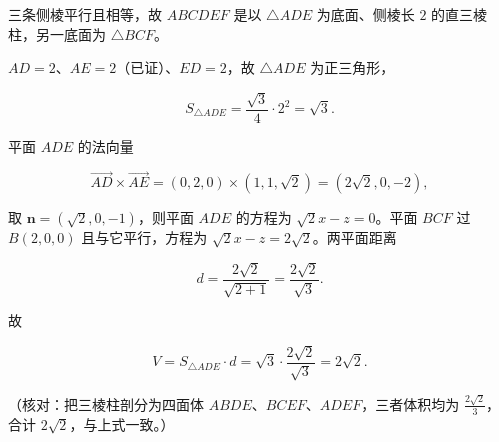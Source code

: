 \begin{answer}
三条侧棱平行且相等，故 $ABCDEF$ 是以 $\triangle ADE$ 为底面、侧棱长 $2$ 的直三棱柱，另一底面为 $\triangle BCF$。

$AD=2$、$AE=2$（已证）、$ED=2$，故 $\triangle ADE$ 为正三角形，

\nopagebreak[4]
\[S_{\triangle ADE}=\frac{\sqrt3}{4}\cdot2^2=\sqrt3 .\]

平面 $ADE$ 的法向量

\nopagebreak[4]
\[\overrightarrow{AD}\times\overrightarrow{AE}=(0,2,0)\times(1,1,\sqrt2)=(2\sqrt2,0,-2),\]

取 $\boldsymbol n=(\sqrt2,0,-1)$，则平面 $ADE$ 的方程为 $\sqrt2x-z=0$。平面 $BCF$ 过 $B(2,0,0)$ 且与它平行，方程为 $\sqrt2x-z=2\sqrt2$。两平面距离

\nopagebreak[4]
\[d=\frac{2\sqrt2}{\sqrt{2+1}}=\frac{2\sqrt2}{\sqrt3}.\]

故

\nopagebreak[4]
\[V=S_{\triangle ADE}\cdot d=\sqrt3\cdot\frac{2\sqrt2}{\sqrt3}=2\sqrt2 .\]

（核对：把三棱柱剖分为四面体 $ABDE$、$BCEF$、$ADEF$，三者体积均为 $\frac{2\sqrt2}{3}$，合计 $2\sqrt2$，与上式一致。）


\end{answer}
